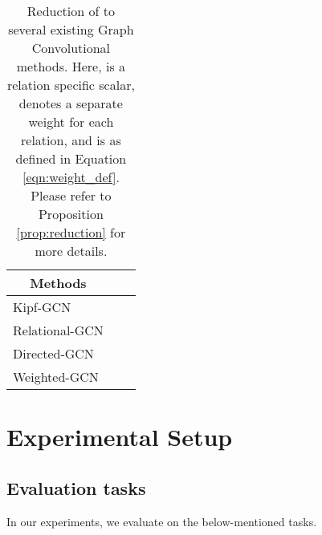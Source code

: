 \documentclass{article} \usepackage{iclr2020_conference,times}
\begin{document}
\begin{table}[t]
	\centering
	\small
	\begin{tabular}{llc}
		\toprule
		\multicolumn{1}{c}{\textbf{Methods}} &  &  \\ 
		\midrule
		Kipf-GCN \citep{Kipf2016} &  &  \vspace{0.5mm}\\ 
		Relational-GCN  \citep{r_gcn} &  &  \vspace{0.5mm}\\ 
		Directed-GCN \citep{gcn_srl} &  &  \vspace{0.5mm}\\ 
		Weighted-GCN  \citep{sacn_paper} &  & \\ 
\bottomrule
	\end{tabular}
	
	\caption{\label{tbl:reduction}Reduction of \method{} to several existing Graph Convolutional methods. Here,  is a relation specific scalar,  denotes a separate weight for each relation, and  is as defined in Equation \ref{eqn:weight_def}. Please refer to Proposition \ref{prop:reduction} for more details.}
\end{table}





 \section{Experimental Setup}













\subsection{Evaluation tasks}
\label{sec:exp_tasks}
In our experiments, we evaluate \method{} on the below-mentioned tasks.
\end{document}
